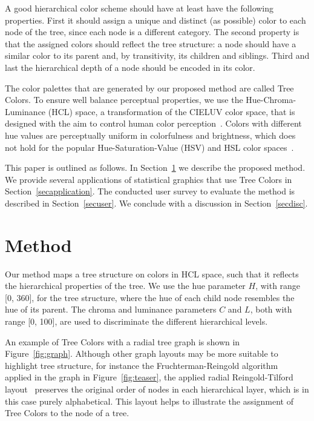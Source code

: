 \documentclass[journal]{vgtc}                %
\begin{document}
A good hierarchical color scheme should have at least have the following properties. First it should assign a unique and distinct (as possible) color to each node of the tree, since each node is a different category. The second property is that the assigned colors should reflect the tree structure: a node should have a similar color to its parent and, by transitivity, its children and siblings.
Third and last the hierarchical depth of a node should be encoded in its color. 

The color palettes that are generated by our proposed method are called Tree Colors. To ensure well
balance perceptual properties, we use the Hue-Chroma-Luminance (HCL) space, a transformation of the CIELUV color space, that is designed with the aim to control human color perception~\cite{ihaka2003}. Colors with different hue values are perceptually uniform in colorfulness and brightness, which does not hold for the popular Hue-Saturation-Value (HSV) and HSL color spaces~\cite{zeileis2009}.

This paper is outlined as follows. In Section~\ref{secmethod} we describe the proposed method. We provide several applications of statistical graphics that use Tree Colors in Section~\ref{secapplication}. The conducted user survey to evaluate the method is described in Section~\ref{secuser}. We conclude with a discussion in Section~\ref{secdisc}.

\section{Method}\label{secmethod}
Our method maps a tree structure on colors in HCL space, such that it reflects the hierarchical properties of the tree. We use the hue parameter $H$, with range [0, 360], for the tree structure, where the hue of each child node resembles the hue of its parent. The chroma and luminance parameters $C$ and $L$, both with range [0, 100], are used to discriminate the different hierarchical levels.

An example of Tree Colors with a radial tree graph is shown in Figure~\ref{fig:graph}. 
Although other graph layouts may be more suitable to highlight tree structure, for instance the Fruchterman-Reingold algorithm~\cite{Fruchterman91} applied in the graph in Figure~\ref{fig:teaser}, the applied radial Reingold-Tilford layout~\cite{reingold81} preserves the original order of nodes in each hierarchical layer, which is in this case purely alphabetical. This layout helps to illustrate the assignment of Tree Colors to the node of a tree. 
\end{document}
